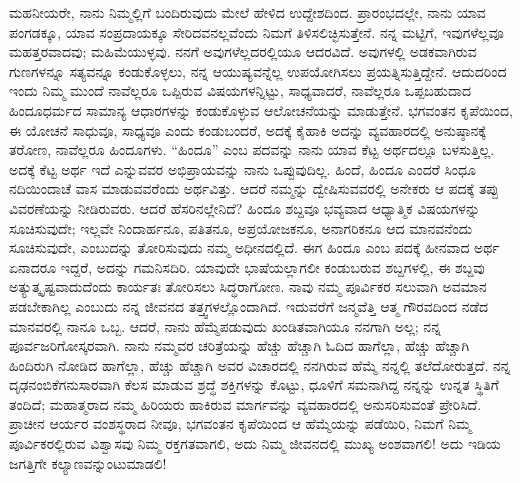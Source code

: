 ಮಹನೀಯರೇ, ನಾನು ನಿಮ್ಮಲ್ಲಿಗೆ ಬಂದಿರುವುದು ಮೇಲೆ ಹೇಳಿದ ಉದ್ದೇಶದಿಂದ. ಪ್ರಾರಂಭದಲ್ಲೇ, ನಾನು ಯಾವ ಪಂಗಡಕ್ಕೂ, ಯಾವ ಸಂಪ್ರದಾಯಕ್ಕೂ ಸೇರಿದವನಲ್ಲವೆಂದು ನಿಮಗೆ ತಿಳಿಸಲಿಚ್ಛಿಸುತ್ತೇನೆ. ನನ್ನ ಮಟ್ಟಿಗೆ, ಇವುಗಳೆಲ್ಲವೂ ಮಹತ್ತರವಾದವು; ಮಹಿಮೆಯುಳ್ಳವು. ನನಗೆ ಅವುಗಳೆಲ್ಲದರಲ್ಲಿಯೂ ಆದರವಿದೆ. ಅವುಗಳಲ್ಲಿ ಅಡಕವಾಗಿರುವ ಗುಣಗಳನ್ನೂ ಸತ್ಯವನ್ನೂ ಕಂಡುಕೊಳ್ಳಲು, ನನ್ನ ಆಯುಷ್ಯವನ್ನೆಲ್ಲ ಉಪಯೋಗಿಸಲು ಪ್ರಯತ್ನಿಸುತ್ತಿದ್ದೇನೆ. ಆದುದರಿಂದ ಇಂದು ನಿಮ್ಮ ಮುಂದೆ ನಾವೆಲ್ಲರೂ ಒಪ್ಪಿರುವ ವಿಷಯಗಳನ್ನಿಟ್ಟು, ಸಾಧ್ಯವಾದರೆ, ನಾವೆಲ್ಲರೂ ಒಪ್ಪಬಹುದಾದ ಹಿಂದೂಧರ್ಮದ ಸಾಮಾನ್ಯ ಆಧಾರಗಳನ್ನು ಕಂಡುಕೊಳ್ಳುವ ಆಲೋಚನೆಯನ್ನು ಮಾಡುತ್ತೇನೆ. ಭಗವಂತನ ಕೃಪೆಯಿಂದ, ಈ ಯೋಚನೆ ಸಾಧುವೂ, ಸಾಧ್ಯವೂ ಎಂದು ಕಂಡುಬಂದರೆ, ಅದಕ್ಕೆ ಕೈಹಾಕಿ ಅದನ್ನು ವ್ಯವಹಾರದಲ್ಲಿ ಅನುಷ್ಠಾನಕ್ಕೆ ತರೋಣ, ನಾವೆಲ್ಲರೂ ಹಿಂದೂಗಳು. “ಹಿಂದೂ” ಎಂಬ ಪದವನ್ನು ನಾನು ಯಾವ ಕೆಟ್ಟ ಅರ್ಥದಲ್ಲೂ ಬಳಸುತ್ತಿಲ್ಲ. ಅದಕ್ಕೆ ಕೆಟ್ಟ ಅರ್ಥ ಇದೆ ಎನ್ನುವವರ ಅಭಿಪ್ರಾಯವನ್ನು ನಾನು ಒಪ್ಪುವುದಿಲ್ಲ. ಹಿಂದೆ, ಹಿಂದೂ ಎಂದರೆ ಸಿಂಧೂ ನದಿಯಿಂದಾಚೆ ವಾಸ ಮಾಡುವವರೆಂದು ಅರ್ಥವಿತ್ತು. ಆದರೆ ನಮ್ಮನ್ನು ದ್ವೇಷಿಸುವವರಲ್ಲಿ ಅನೇಕರು ಆ ಪದಕ್ಕೆ ತಪ್ಪು ವಿವರಣೆಯನ್ನು ನೀಡಿರುವರು. ಆದರೆ ಹೆಸರಿನಲ್ಲೇನಿದೆ? ಹಿಂದೂ ಶಬ್ದವೂ ಭವ್ಯವಾದ ಆಧ್ಯಾತ್ಮಿಕ ವಿಷಯಗಳನ್ನು ಸೂಚಿಸುವುದೇ; ಇಲ್ಲವೇ ನಿಂದಾರ್ಹನೂ, ಪತಿತನೂ, ಅಪ್ರಯೋಜಕನೂ, ಅನಾಗರಿಕನೂ ಆದ ಮಾನವನೆಂದು ಸೂಚಿಸುವುದೇ, ಎಂಬುದನ್ನು ತೋರಿಸುವುದು ನಮ್ಮ ಅಧೀನದಲ್ಲಿದೆ. ಈಗ ಹಿಂದೂ ಎಂಬ ಪದಕ್ಕೆ ಹೀನವಾದ ಅರ್ಥ ಏನಾದರೂ ಇದ್ದರೆ, ಅದನ್ನು ಗಮನಿಸದಿರಿ. ಯಾವುದೇ ಭಾಷೆಯಲ್ಲಾಗಲೀ ಕಂಡುಬರುವ ಶಬ್ದಗಳಲ್ಲಿ, ಈ ಶಬ್ದವು ಅತ್ಯುತ್ಕೃಷ್ಟವಾದುದೆಂದು ಕಾರ್ಯತಃ ತೋರಿಸಲು ಸಿದ್ಧರಾಗೋಣ. ನಾವು ನಮ್ಮ ಪೂರ್ವಿಕರ ಸಲುವಾಗಿ ಅವಮಾನ ಪಡಬೇಕಾಗಿಲ್ಲ ಎಂಬುದು ನನ್ನ ಜೀವನದ ತತ್ತ್ವಗಳಲ್ಲೊಂದಾಗಿದೆ. ಇದುವರೆಗೆ ಜನ್ಮವೆತ್ತಿ ಆತ್ಮ ಗೌರವದಿಂದ ನಡೆದ ಮಾನವರಲ್ಲಿ ನಾನೂ ಒಬ್ಬ. ಆದರೆ, ನಾನು ಹೆಮ್ಮೆಪಡುವುದು ಖಂಡಿತವಾಗಿಯೂ ನನಗಾಗಿ ಅಲ್ಲ; ನನ್ನ ಪೂರ್ವಜರಿಗೋಸ್ಕರವಾಗಿ. ನಾನು ನಮ್ಮವರ ಚರಿತ್ರೆಯನ್ನು ಹೆಚ್ಚು ಹೆಚ್ಚಾಗಿ ಓದಿದ ಹಾಗೆಲ್ಲಾ, ಹೆಚ್ಚು ಹೆಚ್ಚಾಗಿ ಹಿಂದಿರುಗಿ ನೋಡಿದ ಹಾಗೆಲ್ಲಾ, ಹೆಚ್ಚು ಹೆಚ್ಚಾಗಿ ಅವರ ವಿಚಾರದಲ್ಲಿ ನನಗಿರುವ ಹೆಮ್ಮೆ ನನ್ನಲ್ಲಿ ತಲೆದೋರುತ್ತದೆ. ನನ್ನ ದೃಢನಂಬಿಕೆಗನುಸಾರವಾಗಿ ಕೆಲಸ ಮಾಡುವ ಶ್ರದ್ಧೆ ಶಕ್ತಿಗಳನ್ನು ಕೊಟ್ಟು, ಧೂಳಿಗೆ ಸಮನಾಗಿದ್ದ ನನ್ನನ್ನು ಉನ್ನತ ಸ್ಥಿತಿಗೆ ತಂದಿದೆ; ಮಹಾತ್ಮರಾದ ನಮ್ಮ ಹಿರಿಯರು ಹಾಕಿರುವ ಮಾರ್ಗವನ್ನು ವ್ಯವಹಾರದಲ್ಲಿ ಅನುಸರಿಸುವಂತೆ ಪ್ರೇರಿಸಿದೆ. ಪ್ರಾಚೀನ ಆರ್ಯರ ವಂಶಸ್ಥರಾದ ನೀವೂ, ಭಗವಂತನ ಕೃಪೆಯಿಂದ ಆ ಹೆಮ್ಮೆಯನ್ನು ಪಡೆಯಿರಿ, ನಿಮಗೆ ನಿಮ್ಮ ಪೂರ್ವಿಕರಲ್ಲಿರುವ ವಿಶ್ವಾಸವು ನಿಮ್ಮ ರಕ್ತಗತವಾಗಲಿ, ಅದು ನಿಮ್ಮ ಜೀವನದಲ್ಲಿ ಮುಖ್ಯ ಅಂಶವಾಗಲಿ! ಅದು ಇಡಿಯ ಜಗತ್ತಿಗೇ ಕಲ್ಯಾಣವನ್ನುಂಟುಮಾಡಲಿ!

